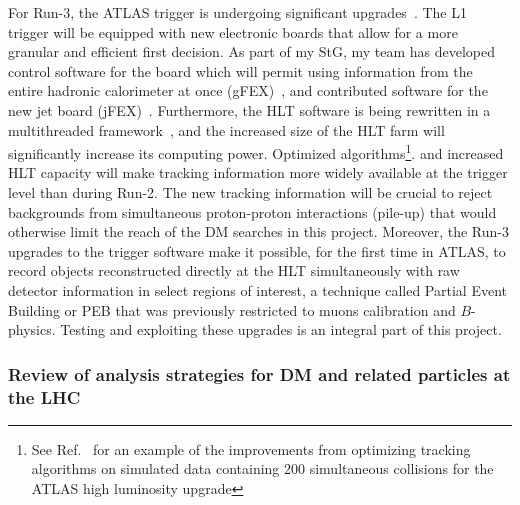 For Run-3, the ATLAS trigger is undergoing significant upgrades~\cite{Aad:1602235}. 
The L1 trigger will be equipped with new electronic boards that allow for a more granular and efficient first decision. 
As part of my StG, my team has developed control software for the board which will permit using information from the entire hadronic calorimeter at once (gFEX)~\cite{Tang:2016ded}, 
and contributed software for the new jet board (jFEX)~\cite{Bauss:2018nde}. 
Furthermore, the HLT software is being rewritten in a multithreaded framework~\cite{Bielski:2674286}, and the increased size of the HLT farm will significantly increase its computing power.
Optimized algorithms\footnote{See Ref.~\cite{ATL-PHYS-PUB-2019-041} %
for an example of the improvements from optimizing tracking algorithms on simulated data containing 200 simultaneous collisions for the ATLAS high luminosity upgrade}. 
and increased HLT capacity will make tracking information more widely available at the trigger level than during Run-2. 
The new tracking information will be crucial to reject backgrounds from simultaneous proton-proton interactions (pile-up) that would otherwise limit the reach of the DM searches in this project.
Moreover, the Run-3 upgrades to the trigger software make it possible, for the first time in ATLAS, to record objects reconstructed directly at the HLT simultaneously with raw detector information in select regions of interest, a technique called Partial Event Building or PEB that was previously restricted to muons calibration and $B$-physics. 
Testing and exploiting these upgrades is an integral part of this project. 


\subsubsection{Review of analysis strategies for DM and related particles at the LHC}

